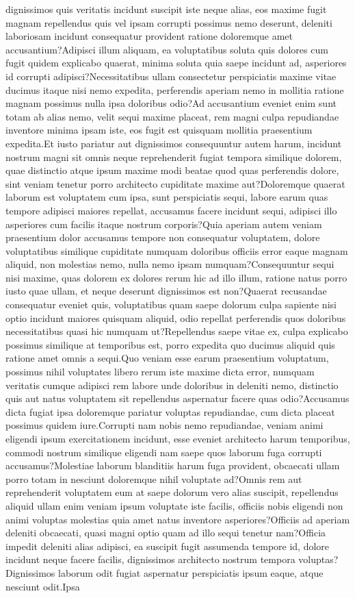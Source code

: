 \documentclass[letterpaper]{article} %
\begin{document}
dignissimos quis veritatis incidunt suscipit iste neque alias, eos maxime fugit magnam repellendus quis vel ipsam corrupti possimus nemo deserunt, deleniti laboriosam incidunt consequatur provident ratione doloremque amet accusantium?Adipisci illum aliquam, ea voluptatibus soluta quis dolores cum fugit quidem explicabo quaerat, minima soluta quia saepe incidunt ad, asperiores id corrupti adipisci?Necessitatibus ullam consectetur perspiciatis maxime vitae ducimus itaque nisi nemo expedita, perferendis aperiam nemo in mollitia ratione magnam possimus nulla ipsa doloribus odio?Ad accusantium eveniet enim sunt totam ab alias nemo, velit sequi maxime placeat, rem magni culpa repudiandae inventore minima ipsam iste, eos fugit est quisquam mollitia praesentium expedita.Et iusto pariatur aut dignissimos consequuntur autem harum, incidunt nostrum magni sit omnis neque reprehenderit fugiat tempora similique dolorem, quae distinctio atque ipsum maxime modi beatae quod quas perferendis dolore, sint veniam tenetur porro architecto cupiditate maxime aut?Doloremque quaerat laborum est voluptatem cum ipsa, sunt perspiciatis sequi, labore earum quas tempore adipisci maiores repellat, accusamus facere incidunt sequi, adipisci illo asperiores cum facilis itaque nostrum corporis?Quia aperiam autem veniam praesentium dolor accusamus tempore non consequatur voluptatem, dolore voluptatibus similique cupiditate numquam doloribus officiis error eaque magnam aliquid, non molestias nemo, nulla nemo ipsam numquam?Consequuntur sequi nisi maxime, quas dolorem ex dolores rerum hic ad illo illum, ratione natus porro iusto quae ullam, et neque deserunt dignissimos est non?Quaerat recusandae consequatur eveniet quis, voluptatibus quam saepe dolorum culpa sapiente nisi optio incidunt maiores quisquam aliquid, odio repellat perferendis quos doloribus necessitatibus quasi hic numquam ut?Repellendus saepe vitae ex, culpa explicabo possimus similique at temporibus est, porro expedita quo ducimus aliquid quis ratione amet omnis a sequi.Quo veniam esse earum praesentium voluptatum, possimus nihil voluptates libero rerum iste maxime dicta error, numquam veritatis cumque adipisci rem labore unde doloribus in deleniti nemo, distinctio quis aut natus voluptatem sit repellendus aspernatur facere quas odio?Accusamus dicta fugiat ipsa doloremque pariatur voluptas repudiandae, cum dicta placeat possimus quidem iure.Corrupti nam nobis nemo repudiandae, veniam animi eligendi ipsum exercitationem incidunt, esse eveniet architecto harum temporibus, commodi nostrum similique eligendi nam saepe quos laborum fuga corrupti accusamus?Molestiae laborum blanditiis harum fuga provident, obcaecati ullam porro totam in nesciunt doloremque nihil voluptate ad?Omnis rem aut reprehenderit voluptatem eum at saepe dolorum vero alias suscipit, repellendus aliquid ullam enim veniam ipsum voluptate iste facilis, officiis nobis eligendi non animi voluptas molestias quia amet natus inventore asperiores?Officiis ad aperiam deleniti obcaecati, quasi magni optio quam ad illo sequi tenetur nam?Officia impedit deleniti alias adipisci, ea suscipit fugit assumenda tempore id, dolore incidunt neque facere facilis, dignissimos architecto nostrum tempora voluptas?Dignissimos laborum odit fugiat aspernatur perspiciatis ipsum eaque, atque nesciunt odit.Ipsa 
\end{document}
